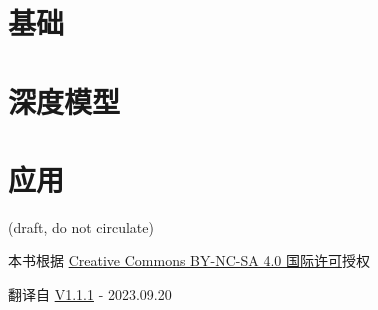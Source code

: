 \documentclass[oneside,11pt]{memoir}
\begin{document}

\part{基础}






\part{深度模型}





\part{应用}








\printindex


\newpage


\ifdefined\draft
\begin{center}
  {\color{red} (draft, do not circulate)}
\end{center}
\else
本书根据
\href{https://creativecommons.org/licenses/by-nc-sa/4.0/}{Creative
  Commons BY-NC-SA 4.0 国际许可}授权
\fi

\begin{center}
    翻译自 \href{https://fleuret.org/public/lbdl.pdf}{V1.1.1} - 2023.09.20
\end{center}



\checknbdrafts
\end{document}
